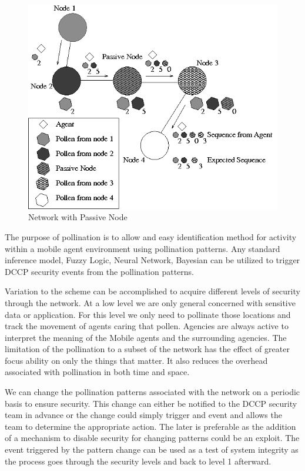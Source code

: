 \documentclass{acm_proc_article-sp}
\begin{document}
\begin{figure}
\centering
\includegraphics[scale=0.45]{AgentPollen-PassivenodeA}
\caption{Network with Passive Node}
\end{figure}

The purpose of pollination is to allow and easy identification method for activity within a mobile agent environment using pollination patterns. Any standard inference model, Fuzzy Logic, Neural Network, Bayesian can be utilized to trigger DCCP security events from the pollination patterns.

Variation to the scheme can be accomplished to acquire different levels of security through the network. At a low level we are only general concerned with sensitive data or application. For this level we only need to pollinate those locations and track the movement of agents caring that pollen. Agencies are always active to interpret the meaning of the Mobile agents and the surrounding agencies. The limitation of the pollination to a subset of the network has the effect of greater focus ability on only the things that matter. It also reduces the overhead associated with pollination in both time and space.

We can change the pollination patterns associated with the network on a periodic basis to ensure security. This change can either be notified to the DCCP security team in advance or the change could simply trigger and event and allows the team to determine the appropriate action. The later is preferable as the addition of a mechanism to disable security for changing patterns could be an exploit. The event triggered by the pattern change can be used as a test of system integrity as the process goes through the security levels and back to level 1 afterward.
\end{document}
